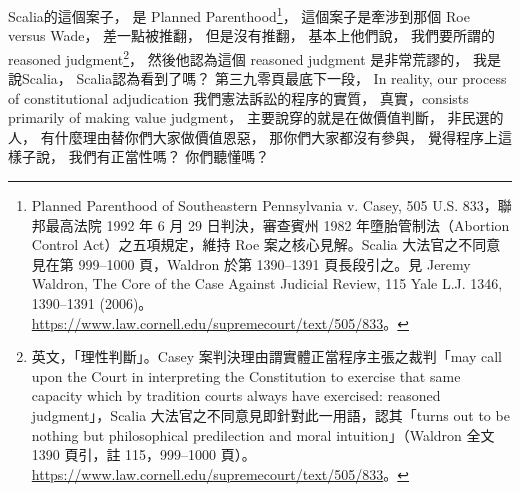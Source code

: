 \hypertarget{w06:cue:2757}{}Scalia的這個案子，
\hypertarget{w06:cue:2758}{}是 Planned Parenthood\footnote{Planned Parenthood of Southeastern Pennsylvania v. Casey, 505 U.S. 833，聯邦最高法院 1992 年 6 月 29 日判決，審查賓州 1982 年墮胎管制法（Abortion Control Act）之五項規定，維持 Roe 案之核心見解。Scalia 大法官之不同意見在第 999–1000 頁，Waldron 於第 1390–1391 頁長段引之。見 Jeremy Waldron, The Core of the Case Against Judicial Review, 115 Yale L.J. 1346, 1390–1391 (2006)。\url{https://www.law.cornell.edu/supremecourt/text/505/833}。}，
\hypertarget{w06:cue:2759}{}這個案子是牽涉到那個 Roe versus Wade，
\hypertarget{w06:cue:2760}{}差一點被推翻，
\hypertarget{w06:cue:2761}{}但是沒有推翻，
\hypertarget{w06:cue:2762}{}基本上他們說，
\hypertarget{w06:cue:2763}{}我們要所謂的 reasoned judgment\footnote{英文，「理性判斷」。Casey 案判決理由謂實體正當程序主張之裁判「may call upon the Court in interpreting the Constitution to exercise that same capacity which by tradition courts always have exercised: reasoned judgment」，Scalia 大法官之不同意見即針對此一用語，認其「turns out to be nothing but philosophical predilection and moral intuition」（Waldron 全文 1390 頁引，註 115，999–1000 頁）。\url{https://www.law.cornell.edu/supremecourt/text/505/833}。}，
\hypertarget{w06:cue:2764}{}然後他認為這個 reasoned judgment 是非常荒謬的，
\hypertarget{w06:cue:2765}{}我是說Scalia，
\hypertarget{w06:cue:2766}{}Scalia認為看到了嗎？
\hypertarget{w06:cue:2767}{}第三九零頁最底下一段，
\hypertarget{w06:cue:2768}{}In reality, our process of constitutional adjudication
\hypertarget{w06:cue:2769}{}我們憲法訴訟的程序的實質，
\hypertarget{w06:cue:2770}{}真實，consists primarily of making value judgment，
\hypertarget{w06:cue:2771}{}主要說穿的就是在做價值判斷，
\hypertarget{w06:cue:2772}{}非民選的人，
\hypertarget{w06:cue:2773}{}有什麼理由替你們大家做價值恩惡，
\hypertarget{w06:cue:2774}{}那你們大家都沒有參與，
\hypertarget{w06:cue:2775}{}覺得程序上這樣子說，
\hypertarget{w06:cue:2776}{}我們有正當性嗎？
\hypertarget{w06:cue:2777}{}你們聽懂嗎？

